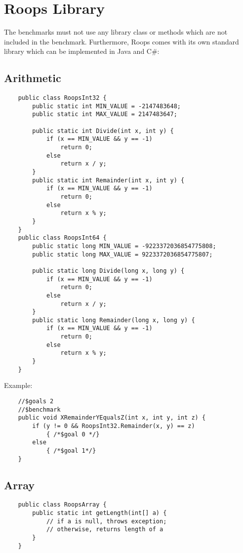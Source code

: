 \label{RoopsLibrary}\section{Roops Library}

The benchmarks must not use any library class or methods which are not included in the benchmark.
Furthermore, Roops comes with its own standard library which can be implemented in Java and C\#:

\subsection{Arithmetic}
\begin{verbatim}
    public class RoopsInt32 {
        public static int MIN_VALUE = -2147483648;
        public static int MAX_VALUE = 2147483647;
        
        public static int Divide(int x, int y) {
            if (x == MIN_VALUE && y == -1) 
                return 0;
            else
                return x / y;
        }
        public static int Remainder(int x, int y) {
            if (x == MIN_VALUE && y == -1) 
                return 0;
            else
                return x % y;   
        }
    }
    public class RoopsInt64 {
        public static long MIN_VALUE = -9223372036854775808;
        public static long MAX_VALUE = 9223372036854775807;
        
        public static long Divide(long x, long y) {
            if (x == MIN_VALUE && y == -1) 
                return 0;
            else
                return x / y;
        }
        public static long Remainder(long x, long y) {
            if (x == MIN_VALUE && y == -1) 
                return 0;
            else
                return x % y;   
        }
    }
\end{verbatim}

Example:
\begin{verbatim}
    //$goals 2
    //$benchmark
    public void XRemainderYEqualsZ(int x, int y, int z) {
        if (y != 0 && RoopsInt32.Remainder(x, y) == z)
            { /*$goal 0 */}
        else
            { /*$goal 1*/}
    }
\end{verbatim}


\subsection{Array}
\begin{verbatim}
    public class RoopsArray {
        public static int getLength(int[] a) {
            // if a is null, throws exception;
            // otherwise, returns length of a
        }
    }
\end{verbatim}
